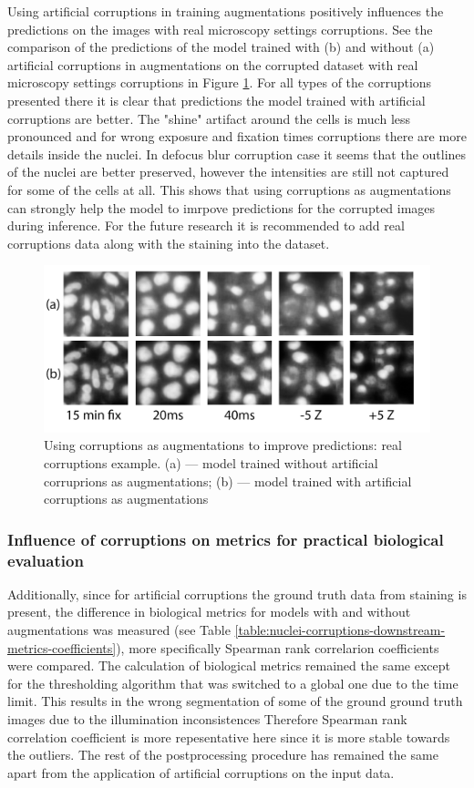 Using artificial corruptions in training augmentations positively influences the predictions on the images with real microscopy settings corruptions. See the comparison of the predictions of the model trained with (b) and without (a) artificial corruptions in augmentations on the corrupted dataset with real microscopy settings corruptions in Figure \ref{fig:augments-help-real}. For all types of the corruptions presented there it is clear that predictions the model trained with artificial corruptions are better. The "shine" artifact around the cells is much less pronounced and for wrong exposure and fixation times corruptions there are more details inside the nuclei. In defocus blur corruption case it seems that the outlines of the nuclei are better preserved, however the intensities are still not captured for some of the cells at all. This shows that using corruptions as augmentations can strongly help the model to imrpove predictions for the corrupted images during inference. For the future research it is recommended to add real corruptions data along with the staining into the dataset.
\begin{figure}[htb]
	\begin{center}
		\includegraphics[width=0.6\linewidth]{bilder/stability/augments-help-real.png}
		\caption[Using corruptions as augmentations to improve predictions: real corruptions example]%
        {Using corruptions as augmentations to improve predictions: real corruptions example. (a) --- model trained without artificial corruprions as augmentations; (b) --- model trained with artificial corruptions as augmentations}\label{fig:augments-help-real}
	\end{center}
\end{figure}

\subsubsection{Influence of corruptions on metrics for practical biological evaluation}
Additionally, since for artificial corruptions the ground truth data from staining is present, the difference in biological metrics for models with and without augmentations was measured (see Table \ref{table:nuclei-corruptions-downstream-metrics-coefficients}), more specifically Spearman rank correlarion coefficients were compared. The calculation of biological metrics remained the same except for the thresholding algorithm that was switched to a global one due to the time limit. This results in the wrong segmentation of some of the ground ground truth images due to the illumination inconsistences Therefore Spearman rank correlation coefficient is more repesentative here since it is more stable towards the outliers. The rest of the postprocessing procedure has remained the same apart from the application of artificial corruptions on the input data.

